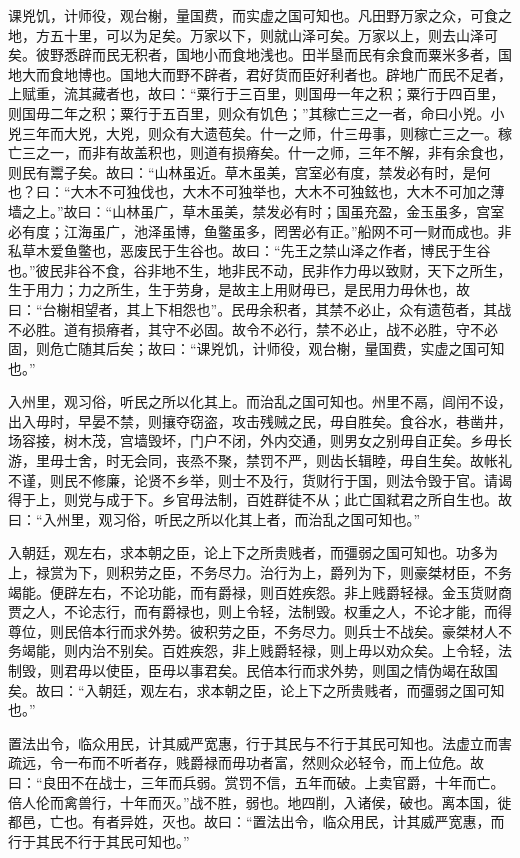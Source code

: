 \documentclass[]{article}
\begin{document}
课兇饥，计师役，观台榭，量国费，而实虚之国可知也。凡田野万家之众，可食之地，方五十里，可以为足矣。万家以下，则就山泽可矣。万家以上，则去山泽可矣。彼野悉辟而民无积者，国地小而食地浅也。田半垦而民有余食而粟米多者，国地大而食地博也。国地大而野不辟者，君好货而臣好利者也。辟地广而民不足者，上赋重，流其藏者也，故曰：``粟行于三百里，则国毋一年之积；粟行于四百里，则国毋二年之积；粟行于五百里，则众有饥色；''其稼亡三之一者，命曰小兇。小兇三年而大兇，大兇，则众有大遗苞矣。什一之师，什三毋事，则稼亡三之一。稼亡三之一，而非有故盖积也，则道有损瘠矣。什一之师，三年不解，非有余食也，则民有鬻子矣。故曰：``山林虽近。草木虽美，宫室必有度，禁发必有时，是何也？曰：``大木不可独伐也，大木不可独举也，大木不可独鉉也，大木不可加之薄墙之上。''故曰：``山林虽广，草木虽美，禁发必有时；国虽充盈，金玉虽多，宫室必有度；江海虽广，池泽虽博，鱼鳖虽多，罔罟必有正。''船网不可一财而成也。非私草木爱鱼鳖也，恶废民于生谷也。故曰：``先王之禁山泽之作者，博民于生谷也。''彼民非谷不食，谷非地不生，地非民不动，民非作力毋以致财，天下之所生，生于用力；力之所生，生于劳身，是故主上用财毋已，是民用力毋休也，故曰：``台榭相望者，其上下相怨也''。民毋余积者，其禁不必止，众有遗苞者，其战不必胜。道有损瘠者，其守不必固。故令不必行，禁不必止，战不必胜，守不必固，则危亡随其后矣；故曰：``课兇饥，计师役，观台榭，量国费，实虚之国可知也。''

入州里，观习俗，听民之所以化其上。而治乱之国可知也。州里不鬲，闾闬不设，出入毋时，早晏不禁，则攘夺窃盗，攻击残贼之民，毋自胜矣。食谷水，巷凿井，场容接，树木茂，宫墙毁坏，门户不闭，外内交通，则男女之别毋自正矣。乡毋长游，里毋士舍，时无会同，丧烝不聚，禁罚不严，则齿长辑睦，毋自生矣。故帐礼不谨，则民不修廉，论贤不乡举，则士不及行，货财行于国，则法令毁于官。请谒得于上，则党与成于下。乡官毋法制，百姓群徒不从；此亡国弒君之所自生也。故曰：``入州里，观习俗，听民之所以化其上者，而治乱之国可知也。''

入朝廷，观左右，求本朝之臣，论上下之所贵贱者，而彊弱之国可知也。功多为上，禄赏为下，则积劳之臣，不务尽力。治行为上，爵列为下，则豪桀材臣，不务竭能。便辟左右，不论功能，而有爵禄，则百姓疾怨。非上贱爵轻禄。金玉货财商贾之人，不论志行，而有爵禄也，则上令轻，法制毁。权重之人，不论才能，而得尊位，则民倍本行而求外势。彼积劳之臣，不务尽力。则兵士不战矣。豪桀材人不务竭能，则内治不别矣。百姓疾怨，非上贱爵轻禄，则上毋以劝众矣。上令轻，法制毁，则君毋以使臣，臣毋以事君矣。民倍本行而求外势，则国之情伪竭在敌国矣。故曰：``入朝廷，观左右，求本朝之臣，论上下之所贵贱者，而彊弱之国可知也。''

置法出令，临众用民，计其威严宽惠，行于其民与不行于其民可知也。法虚立而害疏远，令一布而不听者存，贱爵禄而毋功者富，然则众必轻令，而上位危。故曰：``良田不在战士，三年而兵弱。赏罚不信，五年而破。上卖官爵，十年而亡。倍人伦而禽兽行，十年而灭。''战不胜，弱也。地四削，入诸侯，破也。离本国，徙都邑，亡也。有者异姓，灭也。故曰：``置法出令，临众用民，计其威严宽惠，而行于其民不行于其民可知也。''
\end{document}
